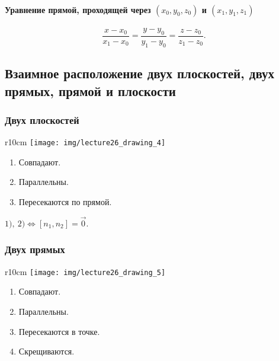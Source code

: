 \paragraph{Уравнение прямой, проходящей через $(x_0, y_0, z_0)$ и $(x_1, y_1, z_1)$}

\begin{equation*}
    \frac{x - x_0}{x_1 - x_0} = \frac{y - y_0}{y_1 - y_0} = \frac{z - z_0}{z_1 - z_0}
.\end{equation*}


\subsection{Взаимное расположение двух плоскостей, двух прямых, прямой и плоскости}

\subsubsection{Двух плоскостей}

\begin{wrapfigure}{r}{10cm}
    \vspace{-70pt}
    \texttt{[image: img/lecture26\_drawing\_4]}
\end{wrapfigure}

\begin{enumerate}[nosep]
    \item \label{lec26:l1} Совпадают.
    \item \label{lec26:l2} Параллельны.
    \item Пересекаются по прямой.
\end{enumerate}

\medskip
$\hyperref[lec26:l1]{1)}, \ \hyperref[lec26:l2]{2)} \iff [n_1, n_2] = \overrightarrow{0}$.


\subsubsection{Двух прямых}

\begin{wrapfigure}{r}{10cm}
    \vspace{-70pt}
    \texttt{[image: img/lecture26\_drawing\_5]}
\end{wrapfigure}

\begin{enumerate}[nosep]
    \item \label{lec26:l3} Совпадают.
    \item \label{lec26:l4} Параллельны.
    \item \label{lec26:l5} Пересекаются в точке.
    \item Скрещиваются.
\end{enumerate}

